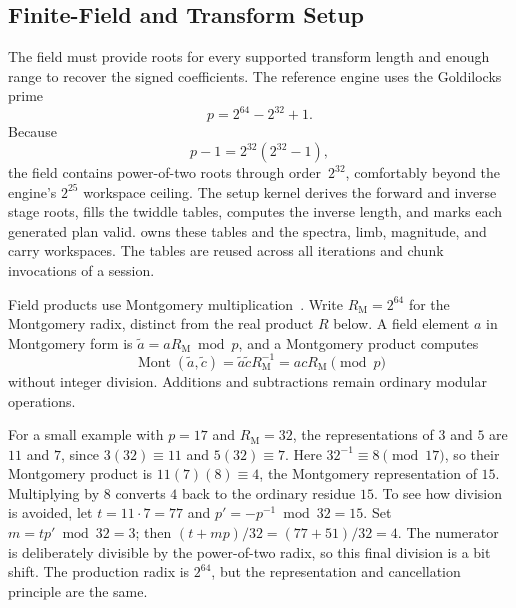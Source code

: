 \subsection{Finite-Field and Transform Setup}
\label{subsec:reference-ntt-field}

The field must provide roots for every supported transform length and enough
range to recover the signed coefficients.  The reference engine uses the Goldilocks prime
\begin{equation}
  p=2^{64}-2^{32}+1.
  \label{eq:reference-goldilocks-prime}
\end{equation}
Because
\begin{equation}
  p-1=2^{32}(2^{32}-1),
\end{equation}
the field contains power-of-two roots through order~$2^{32}$, comfortably
beyond the engine's $2^{25}$ workspace ceiling.  The setup kernel derives the
forward and inverse stage roots, fills the twiddle tables, computes the inverse
length, and marks each generated plan valid.  
owns these tables and the spectra, limb, magnitude, and carry workspaces.  The
tables are reused across all iterations and chunk invocations of a session.

Field products use Montgomery multiplication~\cite{Montgomery1985Modular}.
Write $R_{\mathrm M}=2^{64}$ for the Montgomery radix, distinct from the real
product $R$ below.  A field element $a$ in Montgomery form is
$\widetilde a=aR_{\mathrm M}\bmod p$, and a Montgomery product computes
\begin{equation}
  \operatorname{Mont}(\widetilde a,\widetilde c)
  =\widetilde a\widetilde c R_{\mathrm M}^{-1}
  =acR_{\mathrm M}\pmod p
\end{equation}
without integer division.  Additions and subtractions remain ordinary modular
operations.

For a small example with $p=17$ and $R_{\mathrm M}=32$, the representations
of $3$ and $5$ are $11$ and $7$, since $3(32)\equiv11$ and
$5(32)\equiv7$.  Here $32^{-1}\equiv8\pmod{17}$, so their Montgomery
product is $11(7)(8)\equiv4$, the Montgomery representation of $15$.
Multiplying by $8$ converts $4$ back to the ordinary residue $15$.
To see how division is avoided, let $t=11\cdot7=77$ and
$p'= -p^{-1}\bmod32=15$.  Set $m=tp'\bmod32=3$; then
$(t+mp)/32=(77+51)/32=4$.  The numerator is deliberately divisible by
the power-of-two radix, so this final division is a bit shift.  The production
radix is $2^{64}$, but the representation and cancellation principle are the
same.

